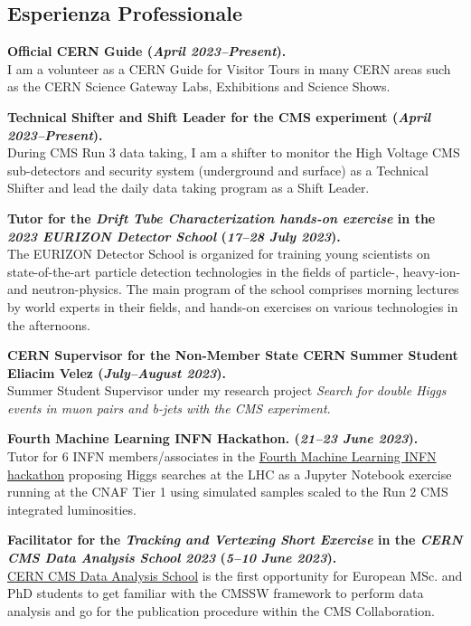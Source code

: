 \documentclass[11pt]{res}
\newcommand{\MarginText}[1]{\section{#1}\vspace{10pt}}
\begin{document}
\begin{resume}

\MarginText{Esperienza Professionale}


\textbf{Official CERN Guide (\textit{April 2023--Present}).}\\
I am a volunteer as a CERN Guide for Visitor Tours in many CERN areas such as the CERN Science Gateway Labs, Exhibitions and Science Shows.

\textbf{Technical Shifter and Shift Leader for the CMS experiment (\textit{April 2023--Present}).}\\
During CMS Run 3 data taking, I am a shifter to monitor the High Voltage CMS sub-detectors and security system (underground and surface) as a Technical Shifter and lead the daily data taking program as a Shift Leader.

\textbf{Tutor for the \textit{Drift Tube Characterization hands-on exercise} in the \textit{2023 EURIZON Detector School} (\textit{17--28 July 2023}).}\\
The EURIZON Detector School is organized for training young scientists on state-of-the-art particle detection technologies in the fields of particle-, heavy-ion- and neutron-physics. The main program of the school comprises morning lectures by world experts in their fields, and hands-on exercises on various technologies in the afternoons. 

\textbf{CERN Supervisor for the Non-Member State CERN Summer Student Eliacim Velez (\textit{July--August 2023}).}\\
Summer Student Supervisor under my research project \textit{Search for double Higgs events in muon pairs and b-jets with the CMS experiment}.

\textbf{Fourth Machine Learning INFN Hackathon. (\textit{21--23 June 2023}).}\\ 
Tutor for 6 INFN members/associates in the \href{https://agenda.infn.it/event/35607/}{Fourth Machine Learning INFN hackathon} proposing Higgs searches at the LHC as a Jupyter Notebook exercise running at the CNAF Tier 1 using simulated samples scaled to the Run 2 CMS integrated luminosities.

\textbf{Facilitator for the \textit{Tracking and Vertexing Short Exercise} in the \textit{CERN CMS Data Analysis School 2023} (\textit{5--10 June 2023}).}\\
\href{https://indico.cern.ch/event/1257234/}{CERN CMS Data Analysis School} is the first opportunity for European MSc. and PhD students to get familiar with the CMSSW framework to perform data analysis and go for the publication procedure within the CMS Collaboration.


\end{resume}
\end{document}
